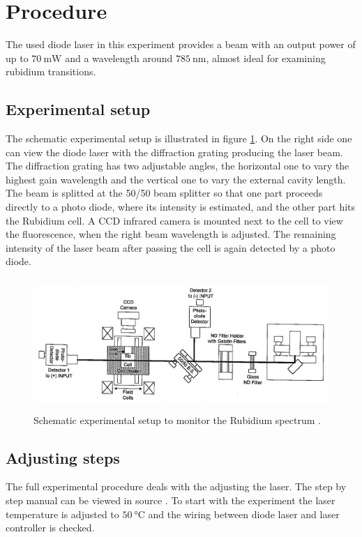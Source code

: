 \section{Procedure}
\label{sec:procedure}

The used diode laser in this experiment provides a beam with an output power of up to $\SI{70}{\milli\watt}$
and a wavelength around $\SI{785}{\nano\meter}$, almost ideal for examining rubidium transitions.

\subsection{Experimental setup}

The schematic experimental setup is illustrated in figure \ref{fig:setup}.
On the right side one can view the diode laser with the diffraction grating producing the laser beam.
The diffraction grating has two adjustable angles, the horizontal one to vary the highest gain wavelength and the vertical
one to vary the external cavity length.
The beam is splitted at the 50/50 beam splitter so that one part proceeds directly to a photo diode, where
its intensity is estimated, and the other part hits the Rubidium cell. A CCD infrared camera is mounted next to the cell
to view the fluorescence, when the right beam wavelength is adjusted. The remaining intensity of the laser beam
after passing the cell is again detected by a photo diode.

\begin{figure}
  \centering
  \includegraphics[height=5cm]{Ordnername/setup.png}
  \caption{Schematic experimental setup to monitor the Rubidium spectrum \cite{manual}.}
  \label{fig:setup}
\end{figure}

\subsection{Adjusting steps}

The full experimental procedure deals with the adjusting the laser. The step by step
manual can be viewed in source \cite{manual}. To start with the experiment the laser temperature
is adjusted to $\SI{50}{\celsius}$ and the wiring between diode laser and laser controller is checked.

